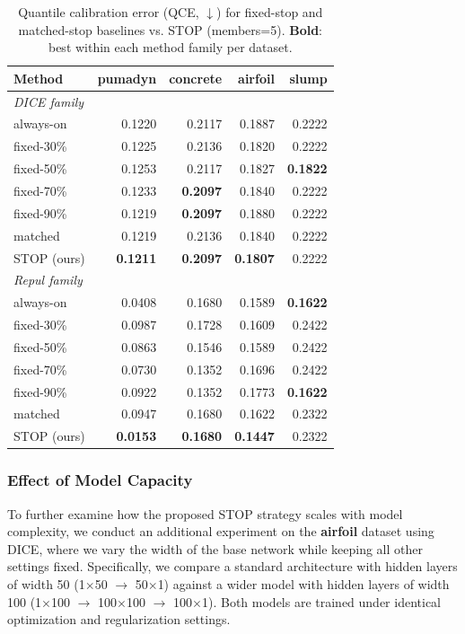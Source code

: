 \documentclass[sigconf]{acmart}
\begin{document}
\begin{table}[ht]
\centering
\caption{Quantile calibration error (QCE, $\downarrow$) for fixed-stop and matched-stop baselines vs. STOP (members=5). \textbf{Bold}: best within each method family per dataset.}
\label{tab:baselines_qce}
\small
\begin{tabular}{lrrrr}
\toprule
\textbf{Method} & \textbf{pumadyn} & \textbf{concrete} & \textbf{airfoil} & \textbf{slump} \\
\midrule
\multicolumn{5}{l}{\textit{DICE family}} \\
always-on   & 0.1220 & 0.2117 & 0.1887 & 0.2222 \\
fixed-30\%  & 0.1225 & 0.2136 & 0.1820 & 0.2222 \\
fixed-50\%  & 0.1253 & 0.2117 & 0.1827 & \textbf{0.1822} \\
fixed-70\%  & 0.1233 & \textbf{0.2097} & 0.1840 & 0.2222 \\
fixed-90\%  & 0.1219 & \textbf{0.2097} & 0.1880 & 0.2222 \\
matched     & 0.1219 & 0.2136 & 0.1840 & 0.2222 \\
STOP (ours) & \textbf{0.1211} & \textbf{0.2097} & \textbf{0.1807} & 0.2222 \\
\midrule
\multicolumn{5}{l}{\textit{Repul family}} \\
always-on   & 0.0408 & 0.1680 & 0.1589 & \textbf{0.1622} \\
fixed-30\%  & 0.0987 & 0.1728 & 0.1609 & 0.2422 \\
fixed-50\%  & 0.0863 & 0.1546 & 0.1589 & 0.2422 \\
fixed-70\%  & 0.0730 & 0.1352 & 0.1696 & 0.2422 \\
fixed-90\%  & 0.0922 & 0.1352 & 0.1773 & \textbf{0.1622} \\
matched     & 0.0947 & 0.1680 & 0.1622 & 0.2322 \\
STOP (ours) & \textbf{0.0153} & \textbf{0.1680} & \textbf{0.1447} & 0.2322 \\
\bottomrule
\end{tabular}
\end{table}

\subsubsection{Effect of Model Capacity}

To further examine how the proposed STOP strategy scales with model complexity, we conduct an additional experiment on the \textbf{airfoil} dataset using DICE, where we vary the width of the base network while keeping all other settings fixed. Specifically, we compare a standard architecture with hidden layers of width 50 (1$\times$50 $\rightarrow$ 50$\times$1) against a wider model with hidden layers of width 100 (1$\times$100 $\rightarrow$ 100$\times$100 $\rightarrow$ 100$\times$1). Both models are trained under identical optimization and regularization settings.
\end{document}
